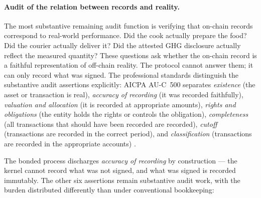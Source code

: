 \documentclass[11pt,a4paper]{article}
\theoremstyle{definition}
\theoremstyle{remark}
\begin{document}
\paragraph{Audit of the relation between records and reality.}
The most substantive remaining audit function is verifying
that on-chain records correspond to real-world performance.
Did the cook actually prepare the food? Did the courier
actually deliver it? Did the attested GHG disclosure
actually reflect the measured quantity? These questions ask
whether the on-chain record is a faithful representation of
off-chain reality. The protocol cannot answer them; it can
only record what was signed. The professional standards
distinguish the substantive audit assertions explicitly: AICPA
AU-C~500 separates \emph{existence} (the asset or transaction
is real), \emph{accuracy of recording} (it was recorded
faithfully), \emph{valuation and allocation} (it is recorded
at appropriate amounts), \emph{rights and obligations} (the
entity holds the rights or controls the obligation),
\emph{completeness} (all transactions that should have been
recorded are recorded), \emph{cutoff} (transactions are
recorded in the correct period), and \emph{classification}
(transactions are recorded in the appropriate accounts)
\citep{aicpa2020auc500}.

The bonded process discharges \emph{accuracy of recording} by
construction --- the kernel cannot record what was not signed,
and what was signed is recorded immutably. The other six
assertions remain substantive audit work, with the burden
distributed differently than under conventional bookkeeping:
\end{document}
